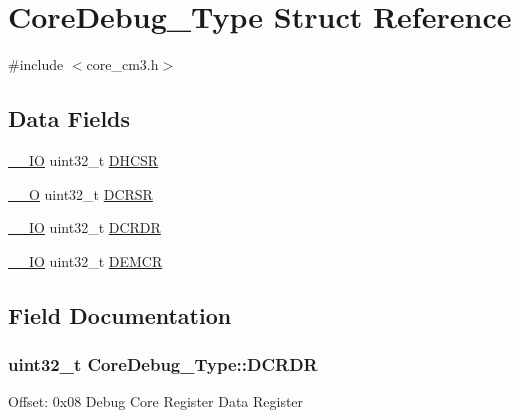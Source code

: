 \hypertarget{structCoreDebug__Type}{}\section{Core\+Debug\+\_\+\+Type Struct Reference}
\label{structCoreDebug__Type}


{\ttfamily \#include $<$core\+\_\+cm3.\+h$>$}

\subsection*{Data Fields}
\begin{DoxyCompactItemize}
\item 
\hyperlink{LPC17xx_8h_aec43007d9998a0a0e01faede4133d6be}{\+\_\+\+\_\+\+IO} uint32\+\_\+t \hyperlink{structCoreDebug__Type_a25c14c022c73a725a1736e903431095d}{D\+H\+C\+SR}
\item 
\hyperlink{LPC17xx_8h_a7e25d9380f9ef903923964322e71f2f6}{\+\_\+\+\_\+O} uint32\+\_\+t \hyperlink{structCoreDebug__Type_afefa84bce7497652353a1b76d405d983}{D\+C\+R\+SR}
\item 
\hyperlink{LPC17xx_8h_aec43007d9998a0a0e01faede4133d6be}{\+\_\+\+\_\+\+IO} uint32\+\_\+t \hyperlink{structCoreDebug__Type_ab8f4bb076402b61f7be6308075a789c9}{D\+C\+R\+DR}
\item 
\hyperlink{LPC17xx_8h_aec43007d9998a0a0e01faede4133d6be}{\+\_\+\+\_\+\+IO} uint32\+\_\+t \hyperlink{structCoreDebug__Type_a5cdd51dbe3ebb7041880714430edd52d}{D\+E\+M\+CR}
\end{DoxyCompactItemize}


\subsection{Field Documentation}
\subsubsection[{\texorpdfstring{D\+C\+R\+DR}{DCRDR}}]{ uint32\+\_\+t Core\+Debug\+\_\+\+Type\+::\+D\+C\+R\+DR}\hypertarget{structCoreDebug__Type_ab8f4bb076402b61f7be6308075a789c9}{}\label{structCoreDebug__Type_ab8f4bb076402b61f7be6308075a789c9}
Offset\+: 0x08 Debug Core Register Data Register 
